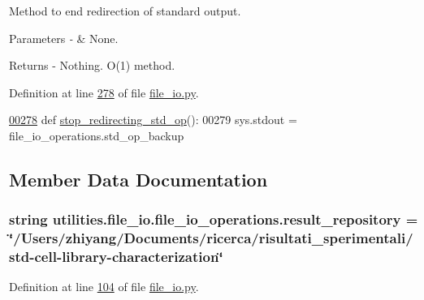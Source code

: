 Method to end redirection of standard output. 


\begin{DoxyParams}{Parameters}
{\em -\/} & None. \\
\hline
\end{DoxyParams}
\begin{DoxyReturn}{Returns}
-\/ Nothing. O(1) method. 
\end{DoxyReturn}


Definition at line \hyperlink{file__io_8py_source_l00278}{278} of file \hyperlink{file__io_8py_source}{file\+\_\+io.\+py}.


\begin{DoxyCode}
\hypertarget{classutilities_1_1file__io_1_1file__io__operations_l00278}{}\hyperlink{classutilities_1_1file__io_1_1file__io__operations_afc81e06fe5b168f0ca2baf3f3cf5f449}{00278}     \textcolor{keyword}{def }\hyperlink{classutilities_1_1file__io_1_1file__io__operations_afc81e06fe5b168f0ca2baf3f3cf5f449}{stop\_redirecting\_std\_op}():
00279         sys.stdout = file\_io\_operations.std\_op\_backup
\end{DoxyCode}


\subsection{Member Data Documentation}
\hypertarget{classutilities_1_1file__io_1_1file__io__operations_a7d92fe3b9053aa784ce73062bed07bd5}{}
\subsubsection[{result\+\_\+repository}]{\setlength{\rightskip}{0pt plus 5cm}string utilities.\+file\+\_\+io.\+file\+\_\+io\+\_\+operations.\+result\+\_\+repository = \char`\"{}/Users/zhiyang/Documents/ricerca/risultati\+\_\+sperimentali/std-\/cell-\/library-\/characterization\char`\"{}\hspace{0.3cm}{\ttfamily [static]}}\label{classutilities_1_1file__io_1_1file__io__operations_a7d92fe3b9053aa784ce73062bed07bd5}


Definition at line \hyperlink{file__io_8py_source_l00104}{104} of file \hyperlink{file__io_8py_source}{file\+\_\+io.\+py}.

